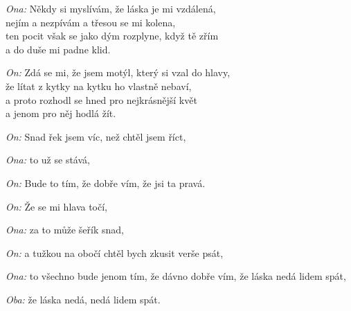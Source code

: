 
\emph{Ona:} Někdy si myslívám, že láska je mi vzdálená,\\
nejím a nezpívám a třesou se mi kolena,\\
ten pocit však se jako dým rozplyne, když tě zřím\\
a do duše mi padne klid.
\vspace{5mm}

\emph{On:} Zdá se mi, že jsem motýl, který si vzal do hlavy,\\
že lítat z kytky na kytku ho vlastně nebaví,\\
a proto rozhodl se hned pro nejkrásnější květ\\
a jenom pro něj hodlá žít.
\vspace{5mm}

\emph{On:} Snad řek jsem víc, než chtěl jsem říct,

\emph{Ona:} to už se stává,\mm{}

\emph{On:} Bude to tím, že dobře vím, že jsi ta pravá. 

\emph{On:} Že se mi hlava točí,

\emph{Ona:} za to může šeřík snad,

\emph{On:} a tužkou na obočí chtěl bych zkusit verše psát,

\emph{Ona:} to všechno bude jenom tím, že dávno dobře vím, že láska nedá lidem spát,

\emph{Oba:} \mm že láska nedá, nedá lidem spát. 
\newpage
